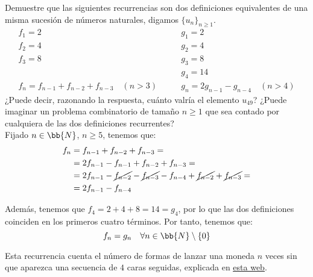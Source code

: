 \documentclass[12pt]{article}
\begin{document}
\begin{ejercicio} Demuestre que las siguientes recurrencias son dos definiciones
    equivalentes de una misma sucesión de números naturales, digamos $\{u_n\}_{n\geq 1}$.
    \begin{equation*}
        \begin{array}{ll}
            f_1 = 2 & g_1 = 2 \\
            f_2 = 4 & g_2 = 4 \\
            f_3 = 8 & g_3 = 8 \\
            & g_4 = 14 \\
            f_n = f_{n-1} + f_{n-2} + f_{n-3} \quad (n > 3) \qquad & g_n = 2g_{n-1} - g_{n-4} \quad (n > 4)
        \end{array}
    \end{equation*}
    ¿Puede decir, razonando la respuesta, cuánto valría el elemento $u_{49}$? ¿Puede imaginar un problema
    combinatorio de tamaño $n\geq 1$ que sea contado por cualquiera de las dos definiciones recurrentes?\\

    Fijado $n\in \bb{N}$, $n\geq 5$, tenemos que:
    \begin{align*}
        f_n &= f_{n-1} + f_{n-2} + f_{n-3} =\\
        &= 2f_{n-1} - f_{n-1} + f_{n-2} + f_{n-3} =\\
        &= 2f_{n-1} - \cancel{f_{n-2}} - \cancel{f_{n-3}} - f_{n-4} + \cancel{f_{n-2}} + \cancel{f_{n-3}} =\\
        &= 2f_{n-1} - f_{n-4}        
    \end{align*}

    Además, tenemos que $f_4=2+4+8=14=g_4$, por lo que las dos definiciones coinciden en los primeros cuatro términos.
    Por tanto, tenemos que:
    \begin{equation*}
        f_n = g_n \quad \forall n\in \bb{N}\setminus \{0\}
    \end{equation*}

    Esta recurrencia cuenta el número de formas de lanzar una moneda $n$ veces sin que aparezca
    una secuencia de $4$ caras seguidas, explicada en \href{https://oeis.org/A135491}{\color{blue}\underline{esta web}}.
\end{ejercicio}
\end{document}
